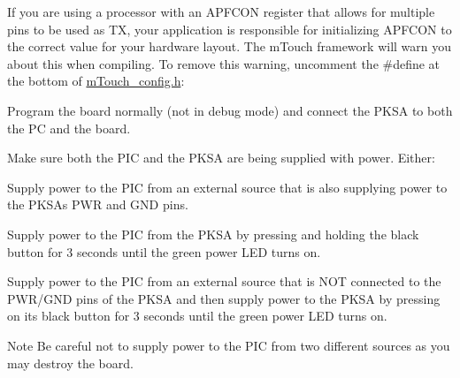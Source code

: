 \begin{DoxyEnumerate}
If you are using a processor with an A\+P\+F\+C\+O\+N register that allows for multiple pins to be used as \textquotesingle{}T\+X\textquotesingle{}, your application is responsible for initializing A\+P\+F\+C\+O\+N to the correct value for your hardware layout. The m\+Touch framework will warn you about this when compiling. To remove this warning, uncomment the \#define at the bottom of \hyperlink{m_touch__config_8h}{m\+Touch\+\_\+config.\+h}\+: 
\begin{DoxyCode}
\textcolor{preprocessor}{#define APFCON\_INITIALIZED    // For processors with an APFCON register(s), this }
                              \textcolor{comment}{// #define can be uncommented to stop the mTouch }
                              \textcolor{comment}{// Framework from producing a "remember to set }
                              \textcolor{comment}{// APFCON" warning.}
                              \textcolor{comment}{//}
                              \textcolor{comment}{// RULE OF PROGRAMMING #4: Register bits initialize, }
                              \textcolor{comment}{//      by law, to the value you don't want. Always }
                              \textcolor{comment}{//      explicitly initialize.}
\end{DoxyCode}



\item Program the board normally (not in debug mode) and connect the P\+K\+S\+A to both the P\+C and the board.~\newline



\item Make sure both the P\+I\+C and the P\+K\+S\+A are being supplied with power. Either\+: 
\begin{DoxyItemize}
\item Supply power to the P\+I\+C from an external source that is also supplying power to the P\+K\+S\+A\textquotesingle{}s P\+W\+R and G\+N\+D pins. 
\item Supply power to the P\+I\+C from the P\+K\+S\+A by pressing and holding the black button for 3 seconds until the green power L\+E\+D turns on. 
\item Supply power to the P\+I\+C from an external source that is N\+O\+T connected to the P\+W\+R/\+G\+N\+D pins of the P\+K\+S\+A and then supply power to the P\+K\+S\+A by pressing on its black button for 3 seconds until the green power L\+E\+D turns on. 
\end{DoxyItemize}\begin{DoxyNote}{Note}
Be careful not to supply power to the P\+I\+C from two different sources as you may destroy the board.
\end{DoxyNote}


\end{DoxyEnumerate}
